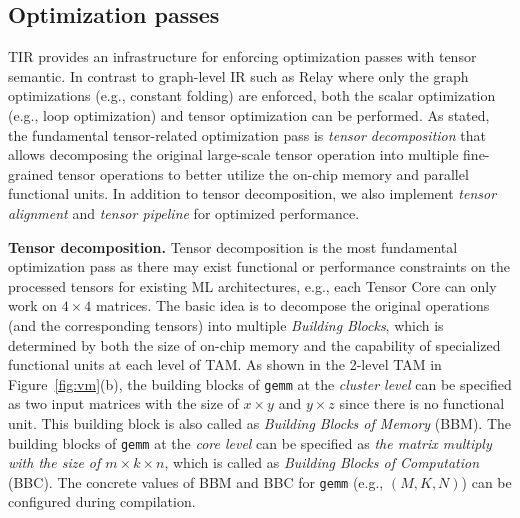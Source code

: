\subsection{Optimization passes}
TIR provides an infrastructure for enforcing optimization passes with tensor semantic. In contrast to graph-level IR such as Relay where only the graph optimizations (e.g., constant folding) are enforced, both the scalar optimization (e.g., loop optimization) and tensor optimization can be performed. As stated, the fundamental tensor-related optimization pass is \emph{tensor decomposition} that allows decomposing the original large-scale tensor operation into multiple fine-grained tensor operations to better utilize the on-chip memory and parallel functional units. In addition to tensor decomposition, we also implement \emph{tensor alignment} and \emph{tensor pipeline} for optimized performance.

\textbf{Tensor decomposition.} Tensor decomposition is the most fundamental optimization pass as there may exist functional or performance constraints on the processed tensors for existing ML architectures, e.g., each Tensor Core can only work on $4 \times 4$ matrices. The basic idea is to decompose the original operations (and the corresponding tensors) into multiple \emph{Building Blocks}, which is determined by both the size of on-chip memory and the capability of specialized functional units at each level of TAM. As shown in the 2-level TAM in Figure~\ref{fig:vm}(b), the building blocks of \texttt{gemm} at the \emph{cluster level} can be specified as two input matrices with the size of $x \times y$ and $y \times z$ since there is no functional unit. This building block is also called as \emph{Building Blocks of Memory} (BBM). The building blocks of \texttt{gemm} at the \emph{core level} can be specified as \emph{the matrix multiply with the size of $m \times k \times n$}, which is called as \emph{Building Blocks of Computation} (BBC). The concrete values of BBM and BBC for \texttt{gemm} (e.g., $(M,K,N)$) can be configured during compilation. %

